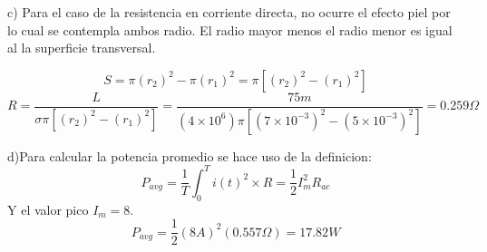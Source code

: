 \documentclass{article}
\begin{document}
\vspace{0.5cm}

\noindent c) Para el caso de la resistencia en corriente directa, no ocurre el efecto piel por lo cual se contempla ambos radio. El radio mayor menos el radio menor es igual al la superficie transversal.

\[S=\pi (r_2)^2 -\pi (r_1)^2 = \pi[(r_2)^2-(r_1)^2]\]
\[R=\frac{L}{\sigma\pi[(r_2)^2-(r_1)^2] }=\frac{75m}{(4\times10^6)\pi[(7\times10^{-3})^2-(5\times 10^{-3})^2]}=0.259\Omega\]

\noindent d)Para calcular la potencia promedio se hace uso de la definicion:
\[P_{avg}=\frac{1}{T} \int_{0}^Ti(t)^2\times R= \frac{1}{2} I_m^2R_{ac}\]
Y el valor pico $I_m=8$.
\[P_{avg}=\frac{1}{2}(8A)^2(0.557\Omega)=17.82W\]
\end{document}
